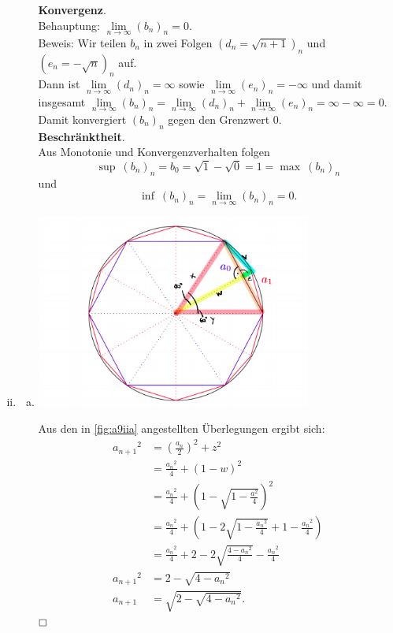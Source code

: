 \documentclass[12pt,a4paper]{article}
\newcommand{\qed}{\null\nobreak\hfill\square}
\begin{document}
\begin{enumerate}[(i)]
\begin{enumerate}[(a)]
        \textbf{Konvergenz}.\\
        Behauptung: $\lim\limits_{n \to \infty} (b_n)_n = 0$.\\
        Beweis: Wir teilen $b_n$ in zwei Folgen $(d_n = \sqrt{n+1})_n$ und $(e_n = -\sqrt{n})_n$ auf.\\
        Dann ist $\lim\limits_{n \to \infty}(d_n)_n = \infty$ sowie $\lim\limits_{n \to \infty}(e_n)_n = -\infty$ und damit insgesamt $\lim\limits_{n \to \infty}(b_n)_n = \lim\limits_{n \to \infty}(d_n)_n + \lim\limits_{n \to \infty}(e_n)_n = \infty - \infty = 0$.\\
        Damit konvergiert $(b_n)_n$ gegen den Grenzwert $0$.\\

        \textbf{Beschränktheit}.\\
        Aus Monotonie und Konvergenzverhalten folgen
        $$\sup\ (b_n)_n = b_0 = \sqrt{1} - \sqrt{0} = 1 = \max\ (b_n)_n$$
        und
        $$\inf\ (b_n)_n = \lim\limits_{n \to \infty} (b_n)_n = 0.$$
    \end{enumerate}


    \item \begin{enumerate}[(a)]
        \item \begin{minipage}{\linewidth}
            \centering
            \includegraphics[width=0.75\textwidth]{circle.png}
            \label{fig:a9iia}
        \end{minipage}

        Aus den in \autoref{fig:a9iia} angestellten Überlegungen ergibt sich:
        \begin{align*}
            {a_{n+1}}^2 &= \left(\frac{a_n}{2}\right)^2 + z^2\\
            &= \frac{{a_n}^2}{4} + (1 - w)^2\\
            &= \frac{{a_n}^2}{4} + \left(1 - \sqrt{1 - \frac{a^2}{4}}\right)^2\\
            &= \frac{{a_n}^2}{4} + \left(1 - 2\sqrt{1 - \frac{{a_n}^2}{4}} + 1 - \frac{{a_n}^2}{4}\right)\\
            &= \frac{{a_n}^2}{4} + 2 - 2\sqrt{\frac{4 - {a_n}^2}{4}} - \frac{{a_n}^2}{4}\\
            {a_{n+1}}^2 &= 2 - \sqrt{4 - {a_n}^2}\\
            a_{n+1} &= \sqrt{2 - \sqrt{4 - {a_n}^2}}.
        \end{align*}
        $\qed$


\end{enumerate}
\end{enumerate}
\end{document}
